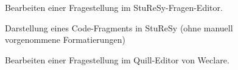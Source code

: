 \begin{figure}[H]
    \centering
    \setlength{\fboxsep}{0pt}
    \setlength{\fboxrule}{0.5pt}
    \caption[StuReSy-Fragen-Editor]{Bearbeiten einer Fragestellung im StuReSy-Fragen-Editor.}
    \label{abb:sturesy_editor}
\end{figure}

\begin{figure}[H]
    \centering
    \setlength{\fboxsep}{0pt}
    \setlength{\fboxrule}{0.5pt}
    \caption[Darstellung eines Code-Fragments in StuReSy]{Darstellung eines Code-Fragments in StuReSy (ohne manuell vorgenommene Formatierungen)}
    \label{abb:sturesy_code_fragment}
\end{figure}


\begin{figure}[H]
    \centering
    \setlength{\fboxsep}{0pt}
    \setlength{\fboxrule}{0.5pt}
    \caption[Quill-Editor von Weclare]{Bearbeiten einer Fragestellung im Quill-Editor von Weclare.}
    \label{abb:weclare_quill}
\end{figure}

